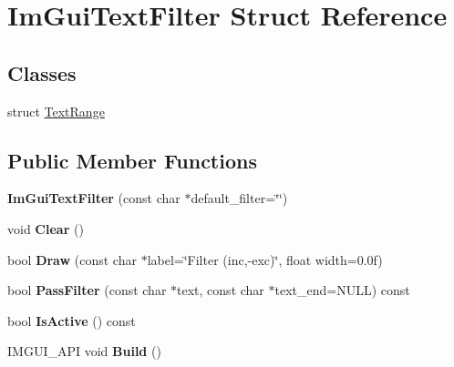 \hypertarget{struct_im_gui_text_filter}{}\section{Im\+Gui\+Text\+Filter Struct Reference}
\label{struct_im_gui_text_filter}
\subsection*{Classes}
\begin{DoxyCompactItemize}
\item 
struct \mbox{\hyperlink{struct_im_gui_text_filter_1_1_text_range}{Text\+Range}}
\end{DoxyCompactItemize}
\subsection*{Public Member Functions}
\begin{DoxyCompactItemize}
\item 
\mbox{\label{struct_im_gui_text_filter_a0a61ee76f0b4f3c354791734b06e3140}} 
{\bfseries Im\+Gui\+Text\+Filter} (const char $\ast$default\+\_\+filter=\char`\"{}\char`\"{})
\item 
\mbox{\label{struct_im_gui_text_filter_a9043c1f0c33d29e6fc9b75ae81f9705a}} 
void {\bfseries Clear} ()
\item 
\mbox{\label{struct_im_gui_text_filter_ab93ad5985019ff9d3781606551fc26cc}} 
bool {\bfseries Draw} (const char $\ast$label=\char`\"{}Filter (inc,-\/exc)\char`\"{}, float width=0.\+0f)
\item 
\mbox{\label{struct_im_gui_text_filter_a88d73ff8b81fbbd0a129b1bf3498d8aa}} 
bool {\bfseries Pass\+Filter} (const char $\ast$text, const char $\ast$text\+\_\+end=N\+U\+LL) const
\item 
\mbox{\label{struct_im_gui_text_filter_a493158f2ab8f45fcf303c3f953be9b88}} 
bool {\bfseries Is\+Active} () const
\item 
\mbox{\label{struct_im_gui_text_filter_aa738a210c97382e37bd656f945acdc46}} 
I\+M\+G\+U\+I\+\_\+\+A\+PI void {\bfseries Build} ()
\end{DoxyCompactItemize}
